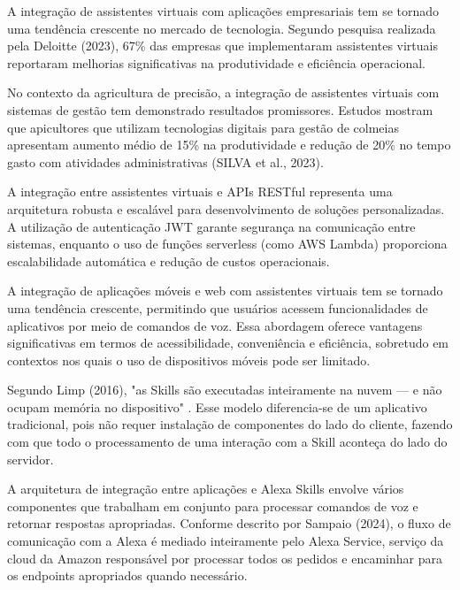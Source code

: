 
A integração de assistentes virtuais com aplicações empresariais tem se tornado uma tendência crescente no mercado de tecnologia. Segundo pesquisa realizada pela Deloitte (2023), 67\% das empresas que implementaram assistentes virtuais reportaram melhorias significativas na produtividade e eficiência operacional.

No contexto da agricultura de precisão, a integração de assistentes virtuais com sistemas de gestão tem demonstrado resultados promissores. Estudos mostram que apicultores que utilizam tecnologias digitais para gestão de colmeias apresentam aumento médio de 15\% na produtividade e redução de 20\% no tempo gasto com atividades administrativas (SILVA et al., 2023).

A integração entre assistentes virtuais e APIs RESTful representa uma arquitetura robusta e escalável para desenvolvimento de soluções personalizadas. A utilização de autenticação JWT garante segurança na comunicação entre sistemas, enquanto o uso de funções serverless (como AWS Lambda) proporciona escalabilidade automática e redução de custos operacionais.

A integração de aplicações móveis e web com assistentes virtuais tem se tornado uma tendência crescente, permitindo que usuários acessem funcionalidades de aplicativos por meio de comandos de voz.
Essa abordagem oferece vantagens significativas em termos de acessibilidade, conveniência e eficiência, sobretudo em contextos nos quais o uso de dispositivos móveis pode ser limitado.

Segundo Limp (2016), "as Skills são executadas inteiramente na nuvem — e não ocupam memória no dispositivo" \cite{wired2016}.
Esse modelo diferencia-se de um aplicativo tradicional, pois não requer instalação de componentes do lado do cliente, fazendo com que todo o processamento de uma interação com a Skill aconteça do lado do servidor.


A arquitetura de integração entre aplicações e Alexa Skills envolve vários componentes que trabalham em conjunto para processar comandos de voz e retornar respostas apropriadas. 
Conforme descrito por Sampaio (2024), o fluxo de comunicação com a Alexa é mediado inteiramente pelo Alexa Service, serviço da cloud da Amazon responsável por processar todos os pedidos e encaminhar para os endpoints apropriados quando necessário.



